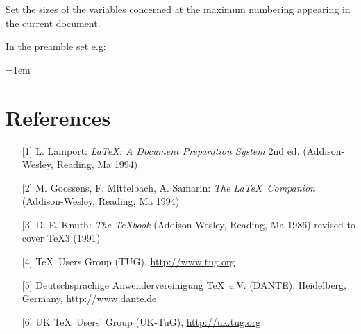 \documentclass[graybox,square]{svmono}
\begin{document}
\begin{sloppy}
Set the sizes of the variables concerned at the maximum numbering appearing in the current document.

In the preamble set e.g:

\cprotect{}


\parskip=1em

\section*{References}

\begin{enumerate}
\item[{[1]}] L. Lamport: \textit{\LaTeX: A Document Preparation System} 2nd ed. (Addison-Wesley, Reading, Ma 1994)
\item[{[2]}] M. Goossens, F. Mittelbach, A. Samarin: \textit{The \LaTeX\ Companion} (Addison-Wesley, Reading, Ma 1994)
\item[{[3]}] D. E. Knuth: \textit{The \TeX book} (Addison-Wesley, Reading, Ma 1986) revised to cover \TeX3 (1991)
\item[{[4]}] \TeX\ Users Group (TUG), \url{http://www.tug.org}
\item[{[5]}] Deutschsprachige Anwendervereinigung \TeX\ e.V. (DANTE), Heidelberg, Germany, \url{http://www.dante.de}
\item[{[6]}] UK \TeX\ Users' Group (UK-TuG), \url{http://uk.tug.org}
\end{enumerate}
\end{sloppy}
\end{document}
